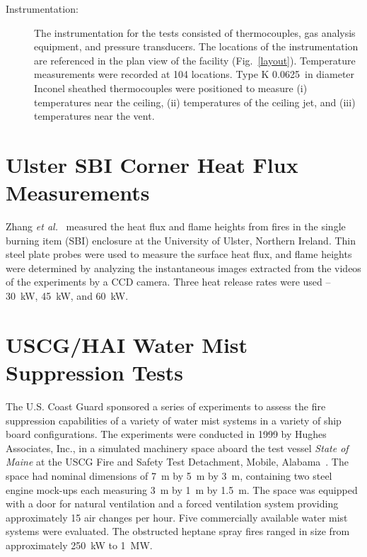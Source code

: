\begin{description}
\item[Instrumentation:] The instrumentation for the tests consisted of thermocouples, gas analysis equipment, and pressure transducers. The locations of the instrumentation are referenced in the plan view of the facility (Fig.~\ref{layout}). Temperature measurements were recorded at 104 locations. Type K 0.0625~in diameter Inconel sheathed thermocouples were positioned to measure (i) temperatures near the ceiling, (ii) temperatures of the ceiling jet, and (iii) temperatures near the vent.
\end{description}



\section{Ulster SBI Corner Heat Flux Measurements}

Zhang {\em et al.}~\cite{Zhang:IAFSS9} measured the heat flux and flame heights from
fires in the single burning item (SBI) enclosure at the University of Ulster, Northern Ireland.
Thin steel plate probes were used to measure the surface heat flux, and flame
heights were determined by analyzing the instantaneous images extracted from the videos of the
experiments by a CCD camera. Three heat release rates were used -- 30~kW, 45~kW, and 60~kW.



\section{USCG/HAI Water Mist Suppression Tests}

The U.S. Coast Guard sponsored a series of experiments to assess the fire suppression capabilities of a variety of water mist systems in a variety of ship board configurations. The
experiments were conducted in 1999 by Hughes Associates, Inc., in a simulated machinery space aboard the test vessel {\em State of Maine} at the USCG Fire and Safety Test Detachment,
Mobile, Alabama~\cite{Back:USCG1999}.
The space had nominal dimensions of 7~m by 5~m by 3~m, containing two steel engine mock-ups each measuring 3~m by 1~m by 1.5~m. The space was equipped with a door
for natural ventilation and a forced ventilation system providing approximately 15 air changes per hour. Five commercially available water mist systems were evaluated. The
obstructed heptane spray fires ranged in size from approximately 250~kW to 1~MW.



